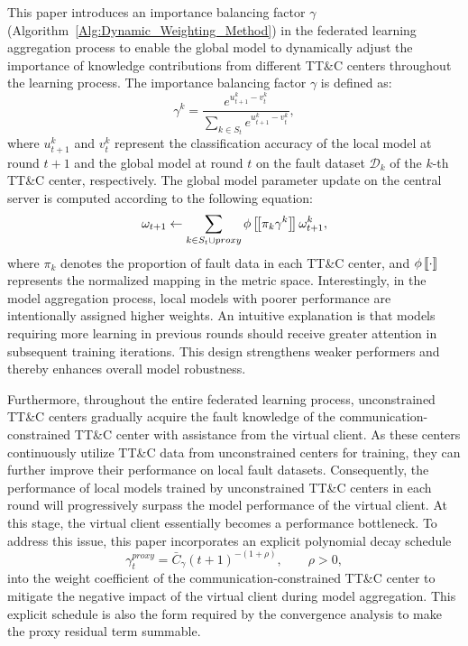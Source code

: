 This paper introduces an importance balancing factor $\gamma$ (Algorithm~\ref{Alg:Dynamic_Weighting_Method}) in the federated learning aggregation process 
to enable the global model to dynamically adjust the importance of knowledge contributions from different TT\&C centers throughout the learning process. 
The importance balancing factor $\gamma$ is defined as:
\begin{equation}
	{\gamma ^k} = \frac{{{e^{u_{t + 1}^k - v_t^k}}}}{{\sum\nolimits_{k \in {S_t}} {{e^{u_{t + 1}^k - v_t^k}}} }},
\end{equation}
\noindent where $u_{t + 1}^k$ and $v_t^k$ represent the classification accuracy of the local model at round $t + 1$ and the global model at round $t$ on the fault dataset ${{\mathscr D}_{k}}$ of the $k$-th TT\&C center, respectively. The global model parameter update on the central server is computed according to the following equation:
\begin{equation}
	{\omega _{t + 1}} \leftarrow \sum_{k \in {S_t} \cup proxy} {\phi \left[\kern-0.15em\left[ {{\pi _k}{\gamma ^k}} 
		\right]\kern-0.15em\right]\omega _{t + 1}^k} ,
\end{equation}
\noindent where ${\pi _k}$ denotes the proportion of fault data in each TT\&C center, 
and $\phi \left[\kern-0.15em\left[ \cdot \right]\kern-0.15em\right]$ represents the normalized mapping in the metric space.
Interestingly, in the model aggregation process, 
local models with poorer performance are intentionally assigned higher weights. 
An intuitive explanation is that models requiring more learning in previous rounds 
should receive greater attention in subsequent training iterations. 
This design strengthens weaker performers and thereby enhances overall model robustness.

Furthermore, throughout the entire federated learning process, 
unconstrained TT\&C centers gradually acquire 
the fault knowledge of the communication-constrained TT\&C center with assistance from the virtual client. 
As these centers continuously utilize TT\&C data from unconstrained centers for training, 
they can further improve their performance on local fault datasets. 
Consequently, the performance of local models trained by unconstrained TT\&C centers 
in each round will progressively surpass the model performance of the virtual client. 
At this stage, the virtual client essentially becomes a performance bottleneck. 
To address this issue, this paper incorporates an explicit polynomial decay schedule
\begin{equation}
	\gamma _t^{proxy}=\bar C_{\gamma}(t+1)^{-(1+\rho )}, \qquad \rho > 0,
\end{equation}
into the weight coefficient of the communication-constrained TT\&C center 
to mitigate the negative impact of the virtual client during model aggregation. This explicit schedule is also the form required by the convergence analysis to make the proxy residual term summable.